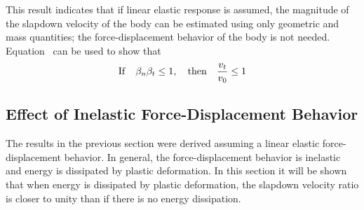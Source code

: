 This result indicates that if linear elastic response is assumed, the
magnitude of the slapdown velocity of the body can be estimated using
only geometric and mass quantities; the force-displacement behavior of
the body is not needed.  Equation~ can be used to show that
\begin{equation}
{\rm If} \quad\beta_n\beta_t \leq1, \quad{\rm then} 
\quad\frac{v_t}{v_0} \leq1\label{eq:blbr}
\end{equation}

\subsection{Effect of Inelastic Force-Displacement Behavior}

The results in the previous section were derived assuming a linear
elastic force-displacement behavior.  In general, the force-displacement
behavior is inelastic and energy is dissipated by plastic deformation.
In this section it will be shown that when energy is dissipated by
plastic deformation, the slapdown velocity ratio is closer to 
unity than if there is no energy dissipation. 

